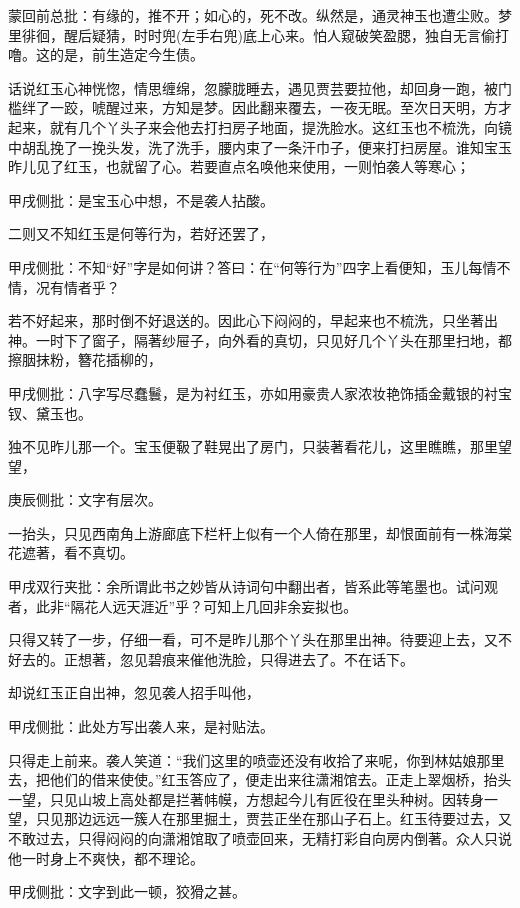 \begin{parag}
    \begin{note}蒙回前总批：有缘的，推不开；如心的，死不改。纵然是，通灵神玉也遭尘败。梦里徘徊，醒后疑猜，时时兜(左手右兜)底上心来。怕人窥破笑盈腮，独自无言偷打噜。这的是，前生造定今生债。\end{note}
\end{parag}


\begin{parag}
    话说红玉心神恍惚，情思缠绵，忽朦胧睡去，遇见贾芸要拉他，却回身一跑，被门槛绊了一跤，唬醒过来，方知是梦。因此翻来覆去，一夜无眠。至次日天明，方才起来，就有几个丫头子来会他去打扫房子地面，提洗脸水。这红玉也不梳洗，向镜中胡乱挽了一挽头发，洗了洗手，腰内束了一条汗巾子，便来打扫房屋。谁知宝玉昨儿见了红玉，也就留了心。若要直点名唤他来使用，一则怕袭人等寒心；\begin{note}甲戌侧批：是宝玉心中想，不是袭人拈酸。\end{note}二则又不知红玉是何等行为，若好还罢了，\begin{note}甲戌侧批：不知“好”字是如何讲？答曰：在“何等行为”四字上看便知，玉儿每情不情，况有情者乎？\end{note}若不好起来，那时倒不好退送的。因此心下闷闷的，早起来也不梳洗，只坐著出神。一时下了窗子，隔著纱屉子，向外看的真切，只见好几个丫头在那里扫地，都擦胭抹粉，簪花插柳的，\begin{note}甲戌侧批：八字写尽蠢鬟，是为衬红玉，亦如用豪贵人家浓妆艳饰插金戴银的衬宝钗、黛玉也。\end{note}独不见昨儿那一个。宝玉便靸了鞋晃出了房门，只装著看花儿，这里瞧瞧，那里望望，\begin{note}庚辰侧批：文字有层次。\end{note}一抬头，只见西南角上游廊底下栏杆上似有一个人倚在那里，却恨面前有一株海棠花遮著，看不真切。\begin{note}甲戌双行夹批：余所谓此书之妙皆从诗词句中翻出者，皆系此等笔墨也。试问观者，此非“隔花人远天涯近”乎？可知上几回非余妄拟也。\end{note}只得又转了一步，仔细一看，可不是昨儿那个丫头在那里出神。待要迎上去，又不好去的。正想著，忽见碧痕来催他洗脸，只得进去了。不在话下。
\end{parag}


\begin{parag}
    却说红玉正自出神，忽见袭人招手叫他，\begin{note}甲戌侧批：此处方写出袭人来，是衬贴法。\end{note}只得走上前来。袭人笑道：“我们这里的喷壶还没有收拾了来呢，你到林姑娘那里去，把他们的借来使使。”红玉答应了，便走出来往潇湘馆去。正走上翠烟桥，抬头一望，只见山坡上高处都是拦著帏幙，方想起今儿有匠役在里头种树。因转身一望，只见那边远远一簇人在那里掘土，贾芸正坐在那山子石上。红玉待要过去，又不敢过去，只得闷闷的向潇湘馆取了喷壶回来，无精打彩自向房内倒著。众人只说他一时身上不爽快，都不理论。\begin{note}甲戌侧批：文字到此一顿，狡猾之甚。\end{note}
\end{parag}


